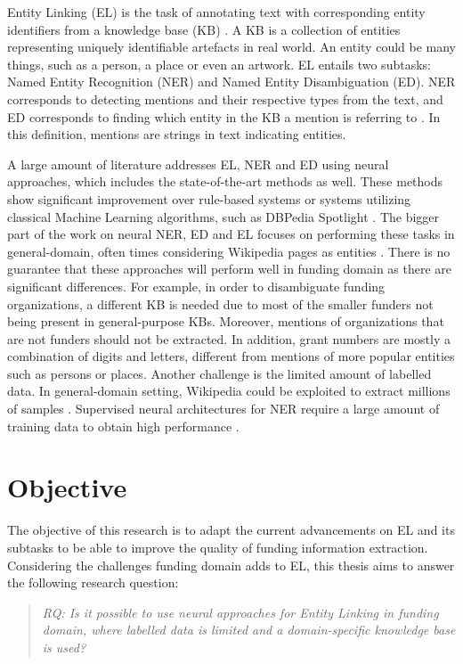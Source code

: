 \documentclass{report}
\theoremstyle{definition}
\theoremstyle{remark}
\begin{document}
Entity Linking (EL) is the task of annotating text with corresponding entity identifiers from a knowledge base (KB) \cite{balog}. A KB is a collection of entities representing uniquely identifiable artefacts in real world. An entity could be many things, such as a person, a place or even an artwork. EL entails two subtasks: Named Entity Recognition (NER) and Named Entity Disambiguation (ED). NER corresponds to detecting mentions and their respective types from the text, and ED corresponds to finding which entity in the KB a mention is referring to \cite{balog}. In this definition, mentions are strings in text indicating entities.

A large amount of literature addresses EL, NER and ED using neural approaches, which includes the state-of-the-art methods \cite{REL,LUKE,mulang} as well. These methods show significant improvement over rule-based systems or systems utilizing classical Machine Learning algorithms, such as DBPedia Spotlight \cite{dbpediaspotlight}. The bigger part of the work on neural NER, ED and EL focuses on performing these tasks in general-domain, often times considering Wikipedia pages as entities \cite{nlpnotes}. There is no guarantee that these approaches will perform well in funding domain as there are significant differences. For example, in order to disambiguate funding organizations, a different KB is needed due to most of the smaller funders not being present in general-purpose KBs. Moreover, mentions of organizations that are not funders should not be extracted. In addition, grant numbers are mostly a combination of digits and letters, different from mentions of more popular entities such as persons or places. Another challenge is the limited amount of labelled data. In general-domain setting, Wikipedia could be exploited to extract millions of samples \cite{bunescu-pasca-2006-using}. Supervised neural architectures for NER require a large amount of training data to obtain high performance \cite{NERsurvey}. 

\section{Objective}

The objective of this research is to adapt the current advancements on EL and its subtasks to be able to improve the quality of funding information extraction. Considering the challenges funding domain adds to EL, this thesis aims to answer the following research question:

\begin{quote}\emph{RQ: Is it possible to use neural approaches for Entity Linking in funding domain, where labelled data is limited and a domain-specific knowledge base is used?}\end{quote}
\end{document}
